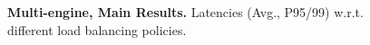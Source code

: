 

\begin{figure}[t]
    \centering
    \vspace{-4mm}
    \caption{\small \textbf{Multi-engine, Main Results.} Latencies (Avg., P95/99) w.r.t. different load balancing policies.} 
    \label{fig:two-engine} 
    \vspace{-2mm}
\end{figure}




